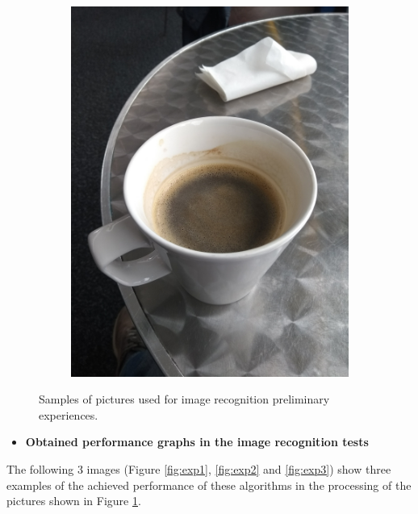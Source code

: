 \begin{figure}[H]
\begin{subfigure}{0.35\textwidth}
    \caption{} 
  \end{subfigure}
    \begin{subfigure}{0.1968\textwidth}
    \includegraphics[width=\textwidth]{Sections/4InitialWork/4_images/run4_pic.jpg}
    \caption{}
   
  \end{subfigure}
  
    \caption[Test images for image recognition experiences]{Samples of pictures used for image recognition preliminary experiences.}
    \label{fig:experi}
    \end{figure}


    \begin{itemize}
      \item \textbf{Obtained performance graphs in the image recognition tests}
    \end{itemize}
    
The following 3 images (Figure \ref{fig:exp1}, \ref{fig:exp2} and \ref{fig:exp3}) show three examples of the achieved performance of these algorithms in the processing of the pictures shown in Figure \ref{fig:experi}.

